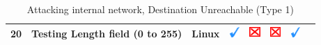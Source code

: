 \documentclass[12pt]{article}
\begin{document}
\begin{savenotes}
\begin{table}[!h]
{{\begin{tabular}{|C{1.0cm}|L{6.0cm}|C{1.5cm}|C{1.0cm}|C{1.0cm}|C{1.0cm}|C{1.0cm}|L{7.0cm}|}
20&Testing Length field (0 to 255)&Linux&\includegraphics[width=4mm, height=4mm]{ok}&\includegraphics[width=4mm, height=4mm]{notok}&\includegraphics[width=4mm, height=4mm]{notok}&\includegraphics[width=4mm, height=4mm]{ok}&\\
\hline
\end{tabular}}}
\caption{Attacking internal network, Destination Unreachable (Type 1)}
\label{table:attackInternalResults1}
\end{table}
\end{savenotes}
\end{document}
